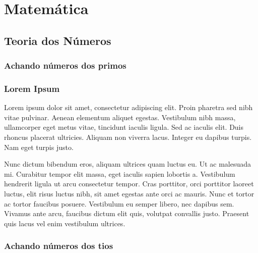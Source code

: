 \section{Matemática}

\subsection{Teoria dos Números}


\subsubsection{Achando números dos primos}
\divisor



\subsubsection{Lorem Ipsum}
Lorem ipsum dolor sit amet, consectetur adipiscing elit. Proin pharetra sed nibh vitae pulvinar. Aenean elementum aliquet egestas. Vestibulum nibh massa, ullamcorper eget metus vitae, tincidunt iaculis ligula. Sed ac iaculis elit. Duis rhoncus placerat ultricies. Aliquam non viverra lacus. Integer eu dapibus turpis. Nam eget turpis justo.

Nunc dictum bibendum eros, aliquam ultrices quam luctus eu. Ut ac malesuada mi. Curabitur tempor elit massa, eget iaculis sapien lobortis a. Vestibulum hendrerit ligula ut arcu consectetur tempor. Cras porttitor, orci porttitor laoreet luctus, elit risus luctus nibh, sit amet egestas ante orci ac mauris. Nunc et tortor ac tortor faucibus posuere. Vestibulum eu semper libero, nec dapibus sem. Vivamus ante arcu, faucibus dictum elit quis, volutpat convallis justo. Praesent quis lacus vel enim vestibulum ultrices.
\divisor



\subsubsection{Achando números dos tios}
\divisor